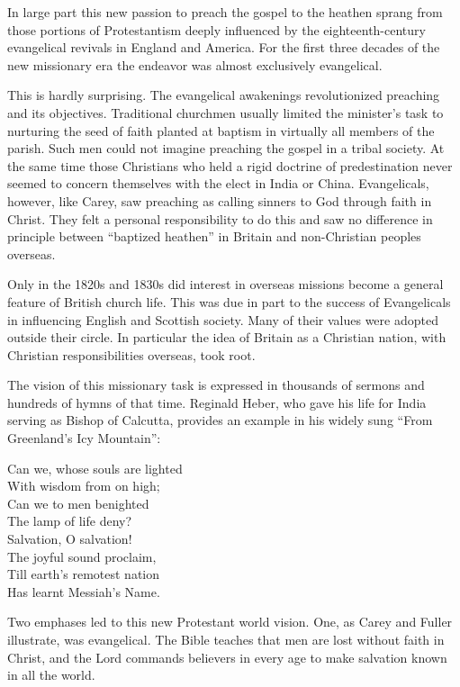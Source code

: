 In large part this new passion to preach the gospel to the heathen sprang from those portions of
Protestantism deeply influenced by the eighteenth-century evangelical revivals in England and
America. For the first three decades of the new missionary era the endeavor was almost exclusively
evangelical.

This is hardly surprising. The evangelical awakenings revolutionized preaching and its objectives.
Traditional churchmen usually limited the minister’s task to nurturing the seed of faith planted at
baptism in virtually all members of the parish. Such men could not imagine preaching the gospel in a
tribal society. At the same time those Christians who held a rigid doctrine of predestination never
seemed to concern themselves with the elect in India or China. Evangelicals, however, like Carey,
saw preaching as calling sinners to God through faith in Christ. They felt a personal responsibility
to do this and saw no difference in principle between “baptized heathen” in Britain and
non-Christian peoples overseas.

Only in the 1820s and 1830s did interest in overseas missions become a general feature of British
church life. This was due in part to the success of Evangelicals in influencing English and Scottish
society. Many of their values were adopted outside their circle. In particular the idea of Britain
as a Christian nation, with Christian responsibilities overseas, took root.

The vision of this missionary task is expressed in thousands of sermons and hundreds of hymns of
that time. Reginald Heber, who gave his life for India serving as Bishop of Calcutta, provides an
example in his widely sung “From Greenland’s Icy Mountain”:

\begin{poem}
Can we, whose souls are lighted\\
With wisdom from on high;\\
Can we to men benighted\\
The lamp of life deny?\\
Salvation, O salvation!\\
The joyful sound proclaim,\\
Till earth’s remotest nation\\
Has learnt Messiah’s Name.
\end{poem}

Two emphases led to this new Protestant world vision. One, as Carey and Fuller illustrate, was
evangelical. The Bible teaches that men are lost without faith in Christ, and the Lord commands
believers in every age to make salvation known in all the world.

